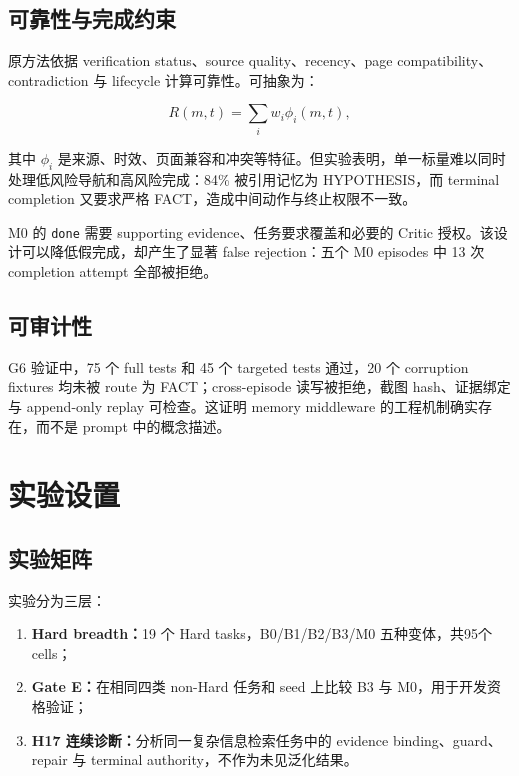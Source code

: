 \documentclass[12pt,a4paper]{ctexart}
\newcommand{\code}[1]{\texttt{#1}}
\begin{document}
\subsection{可靠性与完成约束}

原方法依据 verification status、source quality、recency、page compatibility、contradiction 与 lifecycle 计算可靠性。可抽象为：

\begin{equation}
    R(m,t)=\sum_i w_i\phi_i(m,t),
\end{equation}

其中 $\phi_i$ 是来源、时效、页面兼容和冲突等特征。但实验表明，单一标量难以同时处理低风险导航和高风险完成：84\% 被引用记忆为 HYPOTHESIS，而 terminal completion 又要求严格 FACT，造成中间动作与终止权限不一致。

M0 的 \code{done} 需要 supporting evidence、任务要求覆盖和必要的 Critic 授权。该设计可以降低假完成，却产生了显著 false rejection：五个 M0 episodes 中 13 次 completion attempt 全部被拒绝。

\subsection{可审计性}

G6 验证中，75 个 full tests 和 45 个 targeted tests 通过，20 个 corruption fixtures 均未被 route 为 FACT；cross-episode 读写被拒绝，截图 hash、证据绑定与 append-only replay 可检查。这证明 memory middleware 的工程机制确实存在，而不是 prompt 中的概念描述。

\section{实验设置}

\subsection{实验矩阵}

实验分为三层：

\begin{enumerate}[leftmargin=2em]
    \item \textbf{Hard breadth：}19 个 Hard tasks，B0/B1/B2/B3/M0 五种变体，共95个 cells；
    \item \textbf{Gate E：}在相同四类 non-Hard 任务和 seed 上比较 B3 与 M0，用于开发资格验证；
    \item \textbf{H17 连续诊断：}分析同一复杂信息检索任务中的 evidence binding、guard、repair 与 terminal authority，不作为未见泛化结果。
\end{enumerate}
\end{document}
